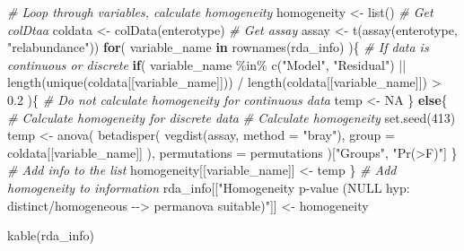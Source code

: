 \documentclass[
]{book}
\newenvironment{Shaded}{\begin{snugshade}}{\end{snugshade}}
\newcommand{\AttributeTok}[1]{\textcolor[rgb]{0.77,0.63,0.00}{#1}}
\newcommand{\CommentTok}[1]{\textcolor[rgb]{0.56,0.35,0.01}{\textit{#1}}}
\newcommand{\ConstantTok}[1]{\textcolor[rgb]{0.00,0.00,0.00}{#1}}
\newcommand{\ControlFlowTok}[1]{\textcolor[rgb]{0.13,0.29,0.53}{\textbf{#1}}}
\newcommand{\DecValTok}[1]{\textcolor[rgb]{0.00,0.00,0.81}{#1}}
\newcommand{\FloatTok}[1]{\textcolor[rgb]{0.00,0.00,0.81}{#1}}
\newcommand{\FunctionTok}[1]{\textcolor[rgb]{0.00,0.00,0.00}{#1}}
\newcommand{\NormalTok}[1]{#1}
\newcommand{\OtherTok}[1]{\textcolor[rgb]{0.56,0.35,0.01}{#1}}
\newcommand{\SpecialCharTok}[1]{\textcolor[rgb]{0.00,0.00,0.00}{#1}}
\newcommand{\StringTok}[1]{\textcolor[rgb]{0.31,0.60,0.02}{#1}}
\begin{document}
\begin{Shaded}
\begin{Highlighting}[]
\CommentTok{\# Loop through variables, calculate homogeneity}
\NormalTok{homogeneity }\OtherTok{\textless{}{-}} \FunctionTok{list}\NormalTok{()}
\CommentTok{\# Get colDtaa}
\NormalTok{coldata }\OtherTok{\textless{}{-}} \FunctionTok{colData}\NormalTok{(enterotype)}
\CommentTok{\# Get assay}
\NormalTok{assay }\OtherTok{\textless{}{-}} \FunctionTok{t}\NormalTok{(}\FunctionTok{assay}\NormalTok{(enterotype, }\StringTok{"relabundance"}\NormalTok{))}
\ControlFlowTok{for}\NormalTok{( variable\_name }\ControlFlowTok{in} \FunctionTok{rownames}\NormalTok{(rda\_info) )\{}
    \CommentTok{\# If data is continuous or discrete}
    \ControlFlowTok{if}\NormalTok{( variable\_name }\SpecialCharTok{\%in\%} \FunctionTok{c}\NormalTok{(}\StringTok{"Model"}\NormalTok{, }\StringTok{"Residual"}\NormalTok{) }\SpecialCharTok{||}
        \FunctionTok{length}\NormalTok{(}\FunctionTok{unique}\NormalTok{(coldata[[variable\_name]])) }\SpecialCharTok{/}
        \FunctionTok{length}\NormalTok{(coldata[[variable\_name]]) }\SpecialCharTok{\textgreater{}} \FloatTok{0.2}\NormalTok{ )\{}
        \CommentTok{\# Do not calculate homogeneity for continuous data}
\NormalTok{        temp }\OtherTok{\textless{}{-}} \ConstantTok{NA}
\NormalTok{    \} }\ControlFlowTok{else}\NormalTok{\{}
        \CommentTok{\# Calculate homogeneity for discrete data}
        \CommentTok{\# Calculate homogeneity}
        \FunctionTok{set.seed}\NormalTok{(}\DecValTok{413}\NormalTok{)}
\NormalTok{        temp }\OtherTok{\textless{}{-}} \FunctionTok{anova}\NormalTok{(}
            \FunctionTok{betadisper}\NormalTok{( }
                \FunctionTok{vegdist}\NormalTok{(assay, }\AttributeTok{method =} \StringTok{"bray"}\NormalTok{),}
                \AttributeTok{group =}\NormalTok{ coldata[[variable\_name]] ),}
            \AttributeTok{permutations =}\NormalTok{ permutations )[}\StringTok{"Groups"}\NormalTok{, }\StringTok{"Pr(\textgreater{}F)"}\NormalTok{]}
\NormalTok{    \}}
    \CommentTok{\# Add info to the list}
\NormalTok{    homogeneity[[variable\_name]] }\OtherTok{\textless{}{-}}\NormalTok{ temp}
\NormalTok{\}}
\CommentTok{\# Add homogeneity to information}
\NormalTok{rda\_info[[}\StringTok{"Homogeneity p{-}value (NULL hyp: distinct/homogeneous {-}{-}\textgreater{} permanova suitable)"}\NormalTok{]] }\OtherTok{\textless{}{-}}
\NormalTok{    homogeneity}

\FunctionTok{kable}\NormalTok{(rda\_info)}
\end{Highlighting}
\end{Shaded}
\end{document}
